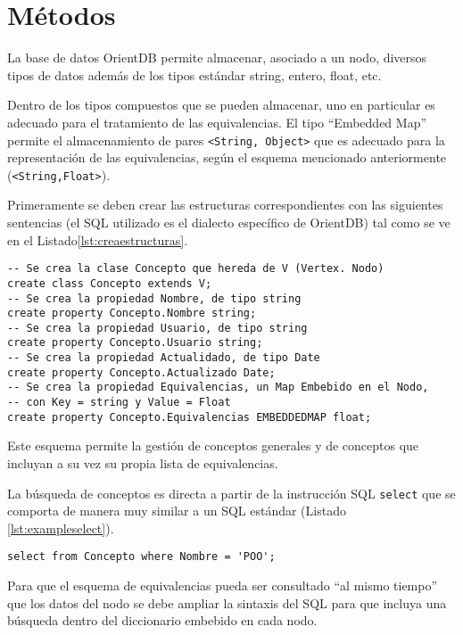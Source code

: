 \documentclass[a4paper,headsepline,footsepline,draft=false]{scrartcl}
\begin{document}
\section{Métodos}

La base de datos OrientDB\cite{orientdb-data-types} permite almacenar, asociado a un nodo, diversos tipos de datos además de los tipos estándar string, entero, float, etc.

Dentro de los tipos compuestos que se pueden almacenar, uno en particular es adecuado para el tratamiento de las equivalencias. El tipo ``Embedded Map'' permite el almacenamiento de pares \texttt{<String, Object>} que es adecuado para la representación de las equivalencias, según el esquema mencionado anteriormente (\texttt{<String,Float>}).

Primeramente se deben crear las estructuras correspondientes con las siguientes sentencias (el SQL utilizado es el dialecto específico de OrientDB) tal como se ve en el Listado\ref{lst:creaestructuras}. 

\begin{lstlisting}[caption={Creación de estructuras},label=lst:creaestructuras]
-- Se crea la clase Concepto que hereda de V (Vertex. Nodo)
create class Concepto extends V;
-- Se crea la propiedad Nombre, de tipo string
create property Concepto.Nombre string;
-- Se crea la propiedad Usuario, de tipo string
create property Concepto.Usuario string;
-- Se crea la propiedad Actualidado, de tipo Date
create property Concepto.Actualizado Date;
-- Se crea la propiedad Equivalencias, un Map Embebido en el Nodo, 
-- con Key = string y Value = Float
create property Concepto.Equivalencias EMBEDDEDMAP float;
\end{lstlisting}

Este esquema permite la gestión de conceptos generales y de conceptos que incluyan a su vez su propia lista de equivalencias.

La búsqueda de conceptos es directa a partir de la instrucción SQL \texttt{select} que se comporta de manera muy similar a un SQL estándar (Listado \ref{lst:exampleselect}).

\begin{lstlisting}[caption={Sentencia SELECT simple},label=lst:exampleselect]
	select from Concepto where Nombre = 'POO';
\end{lstlisting}

Para que el esquema de equivalencias pueda ser consultado ``al mismo tiempo'' que los datos del nodo se debe ampliar la sintaxis del SQL\cite{orientdb-select-syntax} para que incluya una búsqueda dentro del diccionario embebido en cada nodo.
\end{document}
